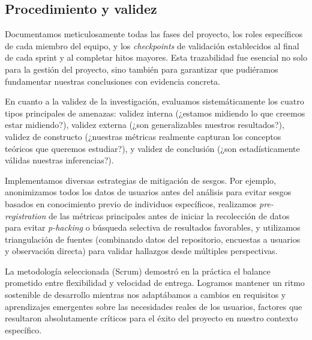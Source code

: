\subsection{Procedimiento y validez}

Documentamos meticulosamente todas las fases del proyecto, los roles específicos de cada miembro del equipo, y los \textit{checkpoints} de validación establecidos al final de cada sprint y al completar hitos mayores. Esta trazabilidad fue esencial no solo para la gestión del proyecto, sino también para garantizar que pudiéramos fundamentar nuestras conclusiones con evidencia concreta.

En cuanto a la validez de la investigación, evaluamos sistemáticamente los cuatro tipos principales de amenazas: validez interna (¿estamos midiendo lo que creemos estar midiendo?), validez externa (¿son generalizables nuestros resultados?), validez de constructo (¿nuestras métricas realmente capturan los conceptos teóricos que queremos estudiar?), y validez de conclusión (¿son estadísticamente válidas nuestras inferencias?).

Implementamos diversas estrategias de mitigación de sesgos. Por ejemplo, anonimizamos todos los datos de usuarios antes del análisis para evitar sesgos basados en conocimiento previo de individuos específicos, realizamos \textit{pre-registration} de las métricas principales antes de iniciar la recolección de datos para evitar \textit{p-hacking} o búsqueda selectiva de resultados favorables, y utilizamos triangulación de fuentes (combinando datos del repositorio, encuestas a usuarios y observación directa) para validar hallazgos desde múltiples perspectivas.

La metodología seleccionada (Scrum) demostró en la práctica el balance prometido entre flexibilidad y velocidad de entrega. Logramos mantener un ritmo sostenible de desarrollo mientras nos adaptábamos a cambios en requisitos y aprendizajes emergentes sobre las necesidades reales de los usuarios, factores que resultaron absolutamente críticos para el éxito del proyecto en nuestro contexto específico.